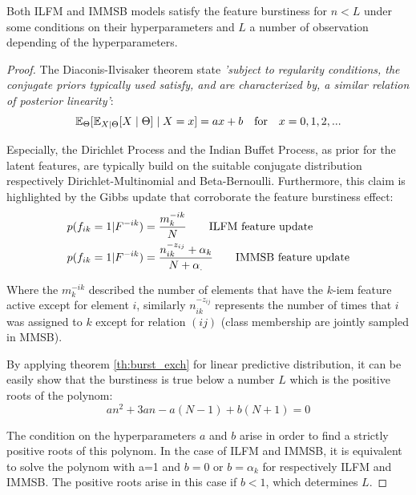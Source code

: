 \begin{proposition} \label{prop:diaconis}
	Both ILFM and IMMSB models satisfy the feature burstiness for $n < L$ under some conditions on their hyperparameters  and $L$ a number of observation depending of the hyperparameters.
\end{proposition}

\begin{proof}
The Diaconis-Ilvisaker theorem \cite{diaconis1979conjugate} state \emph{'subject to regularity conditions, the conjugate priors typically used satisfy, and are characterized by, a  similar relation of posterior linearity'}:
\begin{equation}
\mathbb{E}_\Theta[\mathbb{E}_{X|\Theta}[X\mid \Theta] \mid X=x] = ax+b \quad \textnormal{for} \quad x=0,1,2,... \nonumber
\end{equation}

Especially, the Dirichlet Process and the Indian Buffet Process, as prior for the latent features, are typically build on the suitable conjugate distribution respectively Dirichlet-Multinomial and Beta-Bernoulli. Furthermore, this claim is highlighted by the Gibbs update that corroborate the feature burstiness effect:
\begin{align} \label{eq:feat_up}
&\p(f_{ik} = 1 | F^{-ik}) = \frac{m_k^{-ik}}{N} \qquad \text{ILFM feature update} \nonumber \\
&\p(f_{ik} = 1 | F^{-ik}) = \frac{n_{ik}^{-z_{ij}}+\alpha_k}{N+\alpha_.} \qquad \text{IMMSB feature update} \nonumber \\
\end{align}

Where the $m_k^{-ik}$ described the number of elements that have the $k$-iem feature active except for element $i$, similarly $n_{ik}^{-z_{ij}}$ represents the number of times that $i$ was assigned to $k$ except for relation $(ij)$ (class membership are jointly sampled in MMSB).

By applying theorem \ref{th:burst_exch} for linear predictive distribution, it can be easily show that the burstiness is true below a number $L$ which is the positive roots of the polynom:
\begin{equation}
	 an^2 + 3an - a(N-1) + b(N+1) = 0
\end{equation}

The condition on the hyperparameters $a$ and $b$ arise in order to find a strictly positive roots of this polynom. In the case of ILFM and IMMSB, it is equivalent to solve the polynom with a=1 and  $b=0$ or $b=\alpha_k$ for respectively ILFM and IMMSB. The positive roots arise in this case if $b < 1$, which determines $L$.
\end{proof}

